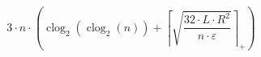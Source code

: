 \[3 \cdot n \cdot \left(\operatorname{clog}_{2}\left(\operatorname{clog}_{2}\left(n\right)\right) + \left\lceil \sqrt{\frac{32 \cdot L \cdot R^{2}}{n \cdot \varepsilon}} \right\rceil_{+}\right)\]
